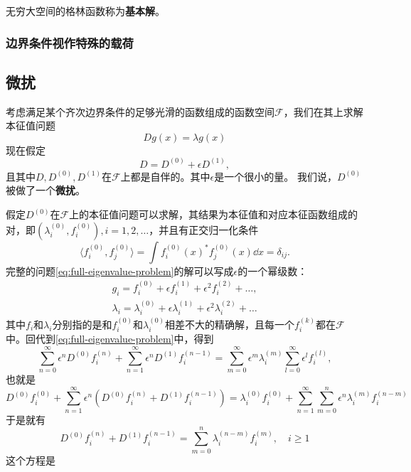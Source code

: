 \documentclass[UTF8]{ctexart}
\begin{document}
无穷大空间的格林函数称为\textbf{基本解}。

\subsubsection{边界条件视作特殊的载荷}

\subsection{微扰}

考虑满足某个齐次边界条件的足够光滑的函数组成的函数空间$\mathcal{F}$，我们在其上求解本征值问题
\begin{equation}
    D g(x) = \lambda g(x)
    \label{eq:full-eigenvalue-problem}
\end{equation}
现在假定
\begin{equation}
    D = D^{(0)} + \epsilon D^{(1)},
    \label{eq:pertubation-operator}
\end{equation}
且其中$D,D^{(0)},D^{(1)}$在$\mathcal{F}$上都是自伴的。其中$\epsilon$是一个很小的量。
我们说，$D^{(0)}$被做了一个\textbf{微扰}。

假定$D^{(0)}$在$\mathcal{F}$上的本征值问题可以求解，其结果为本征值和对应本征函数组成的对，即$(\lambda_i^{(0)}, f^{(0)}_i), i = 1, 2, \ldots$，并且有正交归一化条件
\[
    \langle f^{(0)}_i, f^{(0)}_j \rangle = \int f^{(0)}_i(x)^* f^{(0)}_j(x) \dd x = \delta_{ij}.
\]
完整的问题\eqref{eq:full-eigenvalue-problem}的解可以写成$\epsilon$的一个幂级数：
\[
    \begin{split}
        g_i = f_i^{(0)} + \epsilon f_i^{(1)} + \epsilon^2 f_i^{(2)} + \ldots, \\
        \lambda_i = \lambda_i^{(0)} + \epsilon \lambda_i^{(1)} + \epsilon^2 \lambda_i^{(2)} + \ldots
    \end{split}
\]
其中$f_i$和$\lambda_i$分别指的是和$f^{(0)}_i$和$\lambda^{(0)}_i$相差不大的精确解，且每一个$f_i^{(k)}$都在$\mathcal{F}$中。回代到\eqref{eq:full-eigenvalue-problem}中，得到
\[
    \sum_{n=0}^\infty \epsilon^n D^{(0)} f_i^{(n)} + \sum_{n=1}^\infty \epsilon^n D^{(1)} f_i^{(n-1)} = 
    \sum_{m=0}^\infty \epsilon^m \lambda_i^{(m)} \sum_{l=0}^\infty \epsilon^l f_i^{(l)},
\]
也就是
\[
    D^{(0)} f_i^{(0)} + \sum_{n=1}^\infty \epsilon^n \left( D^{(0)} f_i^{(n)} + D^{(1)} f_i^{(n-1)} \right) =
    \lambda_i^{(0)} f_i^{(0)} + \sum_{n=1}^\infty \sum_{m=0}^n \epsilon^n \lambda_i^{(m)} f_i^{(n-m)}
\]
于是就有
\[
    D^{(0)} f_i^{(n)} + D^{(1)} f_i^{(n-1)} = \sum_{m=0}^n \lambda_i^{(n-m)} f_i^{(m)}, \quad i \geq 1
\]
这个方程是
\end{document}
